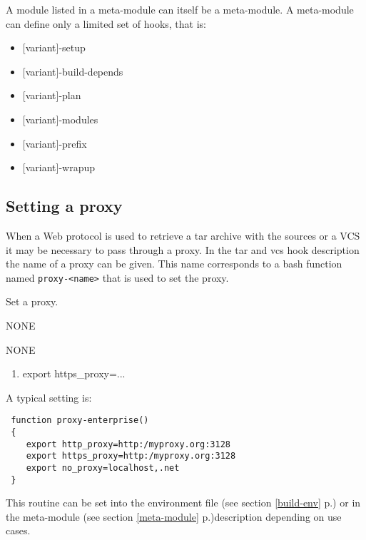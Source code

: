 \documentclass[a4paper,12pt,twoside]{article}
\newcommand{\code}[1]{\texttt{#1}}
\newcommand{\seeref}[1]{see section \ref{#1} p.\pageref{#1}}
\begin{document}
A module listed in a meta-module can itself be a meta-module. A meta-module can define only a limited set of hooks, that is:

\begin{itemize}[font=\texttt]
	\item {[variant]-setup}
	\item {[variant]-build-depends}
	\item {[variant]-plan}
	\item {[variant]-modules}
	\item {[variant]-prefix}
	\item {[variant]-wrapup}
\end{itemize}

\subsection{Setting a proxy}
\label{proxy}

When a Web protocol is used to retrieve a tar archive with the sources or a VCS it may be necessary to pass through a proxy. In the tar and vcs hook description the name of a proxy can be given. This name corresponds to a bash function named \code{proxy-<name>} that is used to set the proxy.

\begin{description}[style=nextline]
	\item[proxy-<name>] Set a proxy.
	\begin{description}[font=\textit,style=standard]
		\item[parameter] \tabto{2cm} NONE
		\item[return] \tabto{2cm} NONE
		\begin{enumerate}
			\item export https\_proxy=...
		\end{enumerate}
	\end{description}
\end{description}

A typical setting is:

\begin{lstlisting}
 function proxy-enterprise()
 {
    export http_proxy=http:/myproxy.org:3128
    export https_proxy=http:/myproxy.org:3128
    export no_proxy=localhost,.net
 }
\end{lstlisting}

This routine can be set into the environment file (\seeref{build-env}) or in the meta-module (\seeref{meta-module})description depending on use cases.
\end{document}
